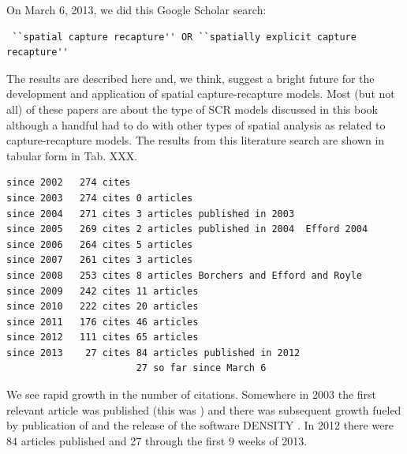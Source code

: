 \label{last.sec.growth}

On March 6, 2013,
we did this Google Scholar search:
\begin{verbatim}
 ``spatial capture recapture'' OR ``spatially explicit capture recapture''
\end{verbatim}
The results are described here and, we think, suggest a bright future
for the development and application of spatial capture-recapture
models.  Most (but not all) of these papers are about the type of SCR models
discussed in this book although a handful had to
do with other types of spatial analysis as related to
capture-recapture models.
The results from this literature search are shown
in tabular form in Tab. XXX.
\begin{verbatim}
since 2002   274 cites
since 2003   274 cites 0 articles
since 2004   271 cites 3 articles published in 2003
since 2005   269 cites 2 articles published in 2004  Efford 2004
since 2006   264 cites 5 articles
since 2007   261 cites 3 articles
since 2008   253 cites 8 articles Borchers and Efford and Royle
since 2009   242 cites 11 articles
since 2010   222 cites 20 articles
since 2011   176 cites 46 articles
since 2012   111 cites 65 articles
since 2013    27 cites 84 articles published in 2012
                       27 so far since March 6
\end{verbatim}

We see rapid growth in the number of citations. Somewhere in 2003 the
first relevant article was published (this was \citet{parmenter_etal:2003})
and there was subsequent growth fueled by publication of
\citet{efford:2004} and the release of the software DENSITY
\citep{efford_etal:2004}. In 2012 there were 84 articles published and
27 through the first 9 weeks of 2013.

